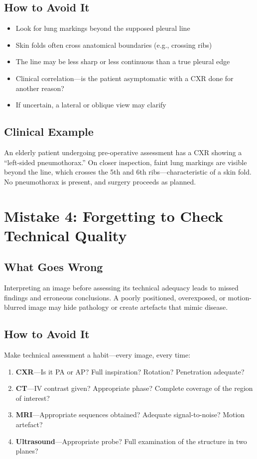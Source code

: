 \subsection{How to Avoid It}
\begin{itemize}
    \item Look for lung markings beyond the supposed pleural line
    \item Skin folds often cross anatomical boundaries (e.g., crossing ribs)
    \item The line may be less sharp or less continuous than a true pleural edge
    \item Clinical correlation---is the patient asymptomatic with a CXR done for another reason?
    \item If uncertain, a lateral or oblique view may clarify
\end{itemize}

\subsection{Clinical Example}
An elderly patient undergoing pre-operative assessment has a CXR showing a ``left-sided pneumothorax.'' On closer inspection, faint lung markings are visible beyond the line, which crosses the 5th and 6th ribs---characteristic of a skin fold. No pneumothorax is present, and surgery proceeds as planned.

\clearpage

\section{Mistake 4: Forgetting to Check Technical Quality}

\subsection{What Goes Wrong}
Interpreting an image before assessing its technical adequacy leads to missed findings and erroneous conclusions. A poorly positioned, overexposed, or motion-blurred image may hide pathology or create artefacts that mimic disease.

\subsection{How to Avoid It}
Make technical assessment a habit---every image, every time:
\begin{enumerate}
    \item \textbf{CXR}---Is it PA or AP? Full inspiration? Rotation? Penetration adequate?
    \item \textbf{CT}---IV contrast given? Appropriate phase? Complete coverage of the region of interest?
    \item \textbf{MRI}---Appropriate sequences obtained? Adequate signal-to-noise? Motion artefact?
    \item \textbf{Ultrasound}---Appropriate probe? Full examination of the structure in two planes?
\end{enumerate}

